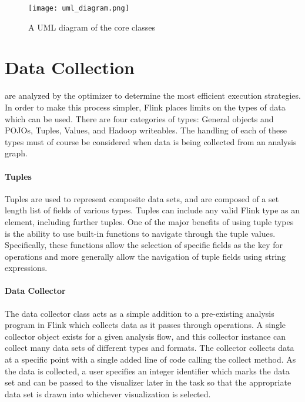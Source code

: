 \begin{figure}
	\centering
	\label{fig:uml}
	\texttt{[image: uml\_diagram.png]}
	\caption{A UML diagram of the core classes}
\end{figure}

\section{Data Collection}
\label{sec:data_collection}
 are analyzed by the optimizer to determine the most efficient execution strategies. In order to make this process simpler, Flink places limits on the types of data which can be used. There are four categories of types: General objects and POJOs, Tuples, Values, and Hadoop writeables. The handling of each of these types must of course be considered when data is being collected from an analysis graph.

\paragraph{Tuples}
Tuples are used to represent composite data sets, and are composed of a set length list of fields of various types. Tuples can include any valid Flink type as an element, including further tuples. One of the major benefits of using tuple types is the ability to use built-in functions to navigate through the tuple values. Specifically, these functions allow the selection of specific fields as the key for operations and more generally allow the navigation of tuple fields using string expressions.

\paragraph{Data Collector}
The data collector class acts as a simple addition to a pre-existing analysis program in Flink which collects data as it passes through operations. A single collector object exists for a given analysis flow, and this collector instance can collect many data sets of different types and formats. The collector collects data at a specific point with a single added line of code calling the collect method. As the data is collected, a user specifies an integer identifier which marks the data set and can be passed to the visualizer later in the task so that the appropriate data set is drawn into whichever visualization is selected. 

